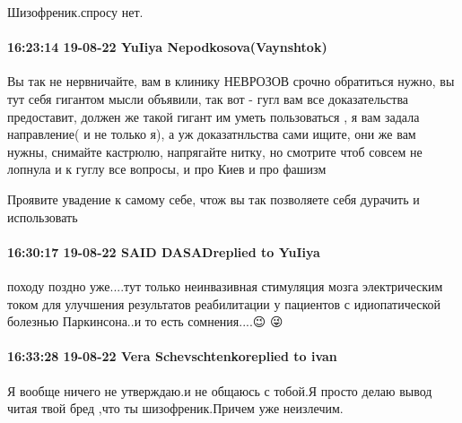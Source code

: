 Шизофреник.спросу нет.

\paragraph{16:23:14 19-08-22 YuIiya Nepodkosova(Vaynshtok)}


Вы так не нервничайте, вам в клинику НЕВРОЗОВ срочно обратиться нужно, вы тут
себя гигантом мысли объявили, так вот - гугл вам все доказательства
предоставит, должен же такой гигант им уметь пользоваться , я вам задала
направление( и не только я), а уж доказатнльства сами ищите, они же вам нужны,
снимайте кастрюлю, напрягайте нитку, но смотрите чтоб совсем не лопнула и к
гуглу все вопросы, и про Киев и про фашизм

Проявите увадение к самому себе, чтож вы так позволяете себя дурачить и
использовать

\paragraph{16:30:17 19-08-22 SAID DASADreplied to YuIiya}

походу поздно уже....тут только неинвазивная стимуляция мозга электрическим
током для улучшения результатов реабилитации у пациентов с идиопатической
болезнью Паркинсона..и то есть сомнения....😉 😜

\paragraph{16:33:28 19-08-22 Vera Schevschtenkoreplied to ivan}

Я вообще ничего не утверждаю.и не общаюсь с тобой.Я просто делаю вывод читая
твой бред ,что ты шизофреник.Причем уже неизлечим.
